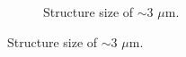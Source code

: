\begin{figure}[!t]
\begin{subfigure}[t]{0.3\linewidth}
 	\centering
 	\caption{Structure size of $\sim$3 $\mu$m.}
 	\label{fig:b2d8_q8}
 \end{subfigure}
 \end{figure}

